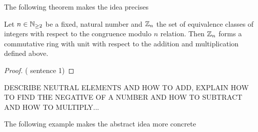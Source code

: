 The following theorem makes the idea precises
\begin{theorem}
\label{def: residual class ring}
Let $ n \in \mathbb{N} _{\geq 2} $ be a fixed, natural number and
$ \mathbb{Z}_n $ the set of equivalence classes of integers with respect to the  congruence modulo $ n $ relation. Then $ \mathbb{Z}_n $ forms a commutative ring with unit with respect to the addition and multiplication defined above.
\end{theorem}
\begin{proof} (\cite{AL} sentence 1)  
\end{proof}
\begin{remark}
DESCRIBE NEUTRAL ELEMENTS AND HOW TO ADD, EXPLAIN HOW TO FIND THE NEGATIVE OF A NUMBER AND HOW TO SUBTRACT AND HOW TO MULTIPLY...
\end{remark}
The following example makes the abstract idea more concrete
